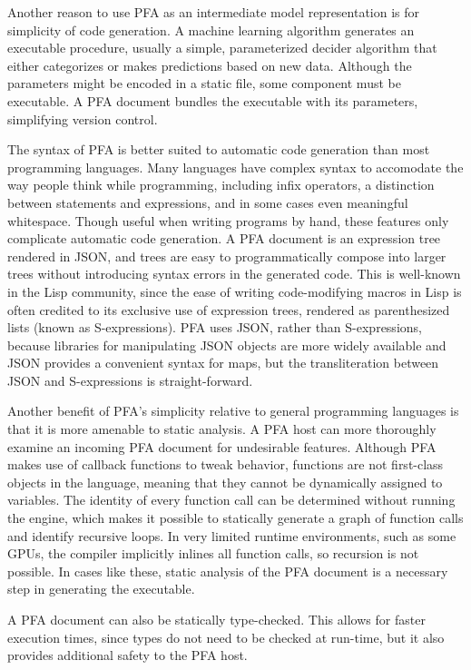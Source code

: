 \documentclass{article}
\begin{document}
Another reason to use PFA as an intermediate model representation is for simplicity of code generation.  A machine learning algorithm generates an executable procedure, usually a simple, parameterized decider algorithm that either categorizes or makes predictions based on new data.  Although the parameters might be encoded in a static file, some component must be executable.  A PFA document bundles the executable with its parameters, simplifying version control.

The syntax of PFA is better suited to automatic code generation than most programming languages.  Many languages have complex syntax to accomodate the way people think while programming, including infix operators, a distinction between statements and expressions, and in some cases even meaningful whitespace.  Though useful when writing programs by hand, these features only complicate automatic code generation.  A PFA document is an expression tree rendered in JSON, and trees are easy to programmatically compose into larger trees without introducing syntax errors in the generated code.  This is well-known in the Lisp community, since the ease of writing code-modifying macros in Lisp is often credited to its exclusive use of expression trees, rendered as parenthesized lists (known as S-expressions).  PFA uses JSON, rather than S-expressions, because libraries for manipulating JSON objects are more widely available and JSON provides a convenient syntax for maps, but the transliteration between JSON and S-expressions is straight-forward.

Another benefit of PFA's simplicity relative to general programming languages is that it is more amenable to static analysis.  A PFA host can more thoroughly examine an incoming PFA document for undesirable features.  Although PFA makes use of callback functions to tweak behavior, functions are not first-class objects in the language, meaning that they cannot be dynamically assigned to variables.  The identity of every function call can be determined without running the engine, which makes it possible to statically generate a graph of function calls and identify recursive loops.  In very limited runtime environments, such as some GPUs, the compiler implicitly inlines all function calls, so recursion is not possible.  In cases like these, static analysis of the PFA document is a necessary step in generating the executable.

A PFA document can also be statically type-checked.  This allows for faster execution times, since types do not need to be checked at run-time, but it also provides additional safety to the PFA host.
\end{document}
